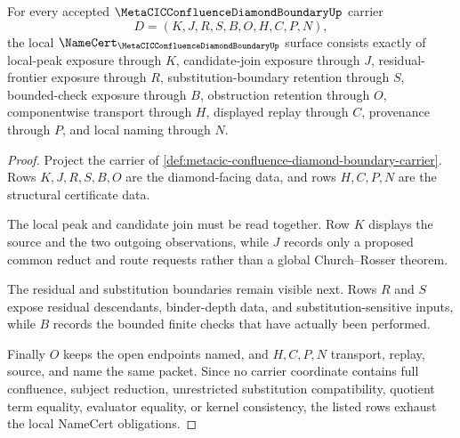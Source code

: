 \begin{theorem}
\label{thm:metacic-confluence-diamond-boundary-obligations}
For every accepted $\MetaCICConfluenceDiamondBoundaryUp$ carrier
$$
D=(K,J,R,S,B,O,H,C,P,N),
$$
the local $\NameCert_{\MetaCICConfluenceDiamondBoundaryUp}$ surface consists exactly of local-peak exposure through $K$, candidate-join exposure through $J$, residual-frontier exposure through $R$, substitution-boundary retention through $S$, bounded-check exposure through $B$, obstruction retention through $O$, componentwise transport through $H$, displayed replay through $C$, provenance through $P$, and local naming through $N$.
\end{theorem}
\begin{proof}
Project the carrier of \autoref{def:metacic-confluence-diamond-boundary-carrier}. Rows $K,J,R,S,B,O$ are the diamond-facing data, and rows $H,C,P,N$ are the structural certificate data.

The local peak and candidate join must be read together. Row $K$ displays the source and the two outgoing observations, while $J$ records only a proposed common reduct and route requests rather than a global Church--Rosser theorem.

The residual and substitution boundaries remain visible next. Rows $R$ and $S$ expose residual descendants, binder-depth data, and substitution-sensitive inputs, while $B$ records the bounded finite checks that have actually been performed.

Finally $O$ keeps the open endpoints named, and $H,C,P,N$ transport, replay, source, and name the same packet. Since no carrier coordinate contains full confluence, subject reduction, unrestricted substitution compatibility, quotient term equality, evaluator equality, or kernel consistency, the listed rows exhaust the local NameCert obligations.
\end{proof}

